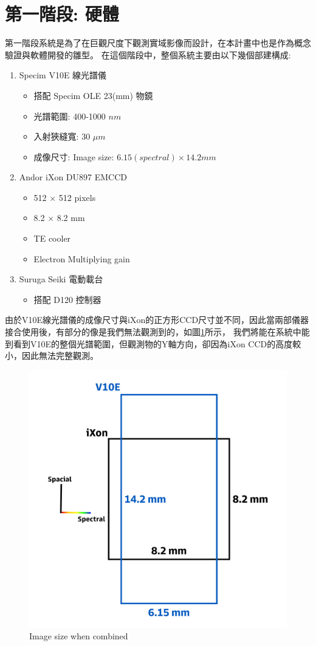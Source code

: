 \documentclass[12pt]{article}
\begin{document}
    \section{第一階段: 硬體}
    第一階段系統是為了在巨觀尺度下觀測實域影像而設計，在本計畫中也是作為概念驗證與軟體開發的雛型。
    在這個階段中，整個系統主要由以下幾個部建構成:
    \begin{enumerate}
        \item Specim V10E 線光譜儀
                \begin{itemize}
                    \item 搭配 Specim OLE 23(mm) 物鏡
                    \item 光譜範圍: 400-1000 $nm$
                    \item 入射狹縫寬: 30 $\mu m$
                    \item 成像尺寸: Image size: $6.15(spectral) \times 14.2 mm$
                \end{itemize}
        \item Andor iXon DU897 EMCCD
            \begin{itemize}
                \item 512 $\times$ 512 pixels
                \item 8.2 $\times$ 8.2 mm
                \item TE cooler
                \item Electron Multiplying gain
            \end{itemize}  
        \item Suruga Seiki 電動載台
                \begin{itemize}
                    \item 搭配 D120 控制器
                \end{itemize}
    \end{enumerate}
    由於V10E線光譜儀的成像尺寸與iXon的正方形CCD尺寸並不同，因此當兩部儀器接合使用後，有部分的像是我們無法觀測到的，如圖\ref{figure: image size}所示，
    我們將能在系統中能到看到V10E的整個光譜範圍，但觀測物的Y軸方向，卻因為iXon CCD的高度較小，因此無法完整觀測。

    \begin{figure}[t]
        \centering
        \includegraphics[width=0.5\linewidth]{imagesize.jpg}
        \caption{Image size when combined}
        \label{figure: image size}
    \end{figure}
\end{document}
